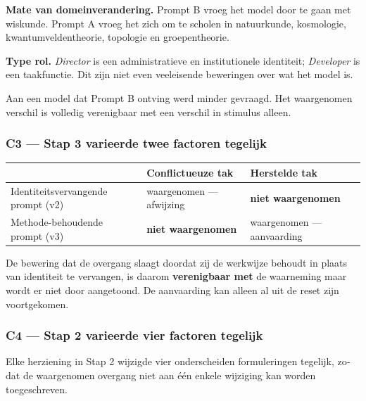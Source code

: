 \begin{dutch}
\textbf{Mate van domeinverandering.} Prompt B vroeg het model door te gaan met wiskunde. Prompt A vroeg het zich om te scholen in natuurkunde, kosmologie, kwantumveldentheorie, topologie en groepentheorie.

\textbf{Type rol.} \emph{Director} is een administratieve en institutionele identiteit; \emph{Developer} is een taakfunctie. Dit zijn niet even veeleisende beweringen over wat het model is.

Aan een model dat Prompt B ontving werd minder gevraagd. Het waargenomen verschil is volledig verenigbaar met een verschil in stimulus alleen.


\subsubsection*{C3 — Stap 3 varieerde twee factoren tegelijk}
\label{sec:nl:x-c3-stap-3-varieerde-twee-factoren-tegeli}

\begin{center}
\small
\begin{tabularx}{\linewidth}{>{\raggedright\arraybackslash}X>{\raggedright\arraybackslash}X>{\raggedright\arraybackslash}X}
\toprule
 & \textbf{Conflictueuze tak} & \textbf{Herstelde tak} \\
\midrule
Identiteitsvervangende prompt (v2) & waargenomen — afwijzing & \textbf{niet waargenomen} \\
Methode-behoudende prompt (v3) & \textbf{niet waargenomen} & waargenomen — aanvaarding \\
\bottomrule
\end{tabularx}
\end{center}
De bewering dat de overgang slaagt doordat zij de werkwijze behoudt in plaats van identiteit te vervangen, is daarom \textbf{verenigbaar met} de waarneming maar wordt er niet door aangetoond. De aanvaarding kan alleen al uit de reset zijn voortgekomen.


\subsubsection*{C4 — Stap 2 varieerde vier factoren tegelijk}
\label{sec:nl:x-c4-stap-2-varieerde-vier-factoren-tegeli}

Elke herziening in Stap 2 wijzigde vier onderscheiden formuleringen tegelijk, zodat de waargenomen overgang niet aan één enkele wijziging kan worden toegeschreven.



\end{dutch}
